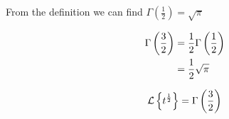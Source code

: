 \begin{remark}
    From the definition we can find $\Gamma (\frac{1}{2}) = \sqrt{\pi}$
\end{remark}

\begin{example}
    \begin{align*}
        \Gamma\left(\frac{3}{2}\right) &= \frac{1}{2} \Gamma\left(\frac{1}{2}\right) \\
        &= \frac{1}{2} \sqrt{\pi}
    \end{align*}    
\end{example}

\begin{example}
    \begin{align*}
        \operatorname{\mathcal{L}}\left\{t^{\frac{1}{2}}\right\} = \Gamma\left(\frac{3}{2}\right)
    \end{align*}
\end{example}
